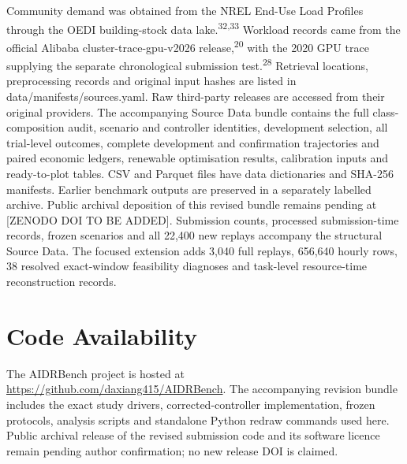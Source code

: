 \documentclass[10pt,a4paper]{article}
\begin{document}
Community demand was obtained from the NREL End-Use Load Profiles through the OEDI building-stock data lake.\textsuperscript{32,33} Workload records came from the official Alibaba cluster-trace-gpu-v2026 release,\textsuperscript{20} with the 2020 GPU trace supplying the separate chronological submission test.\textsuperscript{28} Retrieval locations, preprocessing records and original input hashes are listed in data/manifests/sources.yaml. Raw third-party releases are accessed from their original providers. The accompanying Source Data bundle contains the full class-composition audit, scenario and controller identities, development selection, all trial-level outcomes, complete development and confirmation trajectories and paired economic ledgers, renewable optimisation results, calibration inputs and ready-to-plot tables. CSV and Parquet files have data dictionaries and SHA-256 manifests. Earlier benchmark outputs are preserved in a separately labelled archive. Public archival deposition of this revised bundle remains pending at [ZENODO DOI TO BE ADDED]. Submission counts, processed submission-time records, frozen scenarios and all 22,400 new replays accompany the structural Source Data. The focused extension adds 3,040 full replays, 656,640 hourly rows, 38 resolved exact-window feasibility diagnoses and task-level resource-time reconstruction records.


\section*{Code Availability}

The AIDRBench project is hosted at \url{https://github.com/daxiang415/AIDRBench}. The accompanying revision bundle includes the exact study drivers, corrected-controller implementation, frozen protocols, analysis scripts and standalone Python redraw commands used here. Public archival release of the revised submission code and its software licence remain pending author confirmation; no new release DOI is claimed.
\end{document}
